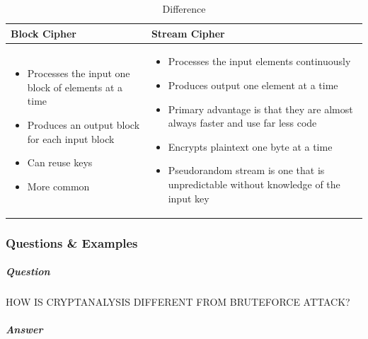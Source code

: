 \documentclass{article}
\begin{document}
                            \begin{table}[h]
                                \begin{center}

                            \begin{tabular}{|p{6cm}|p{6cm}|}
                                \hline
                                \textbf{Block Cipher} & \textbf{Stream Cipher} \\
                                \hline
                                \begin{itemize}
                                  \item Processes the input one block of elements at a time
                                  \item Produces an output block for each input block
                                  \item Can reuse keys
                                  \item More common
                                \end{itemize}
                                &
                                \begin{itemize}
                                  \item Processes the input elements continuously
                                  \item Produces output one element at a time
                                  \item Primary advantage is that they are almost always faster and use far less code
                                  \item Encrypts plaintext one byte at a time
                                  \item Pseudorandom stream is one that is unpredictable without knowledge of the input key
                                \end{itemize} \\
                                \hline
                              
                                \end{tabular}
                            \end{center}
                                \caption{Difference}
                            \end{table}
                        
                        \subsubsection{Questions \& Examples}
                            \subparagraph{Question}
                            HOW IS CRYPTANALYSIS
                            DIFFERENT FROM BRUTEFORCE
                            ATTACK?
                            \subparagraph{Answer} 
                           
\end{document}
